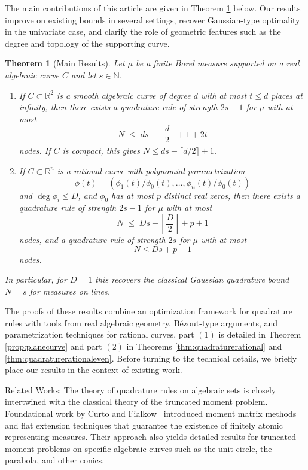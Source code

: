 \documentclass[11pt,a4paper]{amsart}
\makeatletter
\numberwithin{equation}{section}
\newtheorem{thm}{Theorem}
\theoremstyle{definition}
\newcommand{\R}{\mathbb{R}}
\numberwithin{thm}{section}
\def\paragraph{\@startsection{paragraph}{4}%
  \z@{.5\linespacing\@plus.7\linespacing}{-.5em}%
  {\normalfont\normalsize\bfseries}}
\theoremstyle{break}
\numberwithin{subcase}{case}
\makeatother
\begin{document}
The main contributions of this article are given in Theorem \ref{thm1} below. Our results improve on existing bounds in several settings, recover Gaussian-type optimality in the univariate case, and clarify the role of geometric features such as the degree and topology of the supporting curve.\newpage 

\begin{thm}[Main Results]\label{thm1}
Let $\mu$ be a finite Borel measure supported on a real algebraic curve $C$ and let $s \in \mathbb{N}$.
\begin{enumerate}
    \item 
    If $C \subset \R^2$ is a smooth algebraic curve of degree $d$ with at most $t \le d$ places at infinity, then there exists a quadrature rule of strength $2s-1$ for $\mu$ with at most
    \[
    N \;\le\; d s - \left\lceil \frac{d}{2} \right\rceil + 1 + 2t
    \]
    nodes. If $C$ is compact, this gives $N \le d s - \lceil d/2 \rceil + 1$.
    
    \item 
    If $C \subset \R^n$ is a rational curve with polynomial parametrization \[\phi(t) = (\phi_1(t)/\phi_0(t), \ldots, \phi_n(t)/\phi_0(t))\] and $\deg \phi_i \le D$, and $\phi_0$ has at most $p$ distinct real zeros, then there exists a quadrature rule of strength $2s-1$ for $\mu$ with at most
    \[
    N \;\le\; D s - \left\lceil \frac{D}{2} \right\rceil + p + 1
    \]
    nodes, and a quadrature rule of strength $2s$ for $\mu$ with at most $$
    N\leq Ds+p+1
    $$
    nodes.
\end{enumerate}
In particular, for $D=1$ this recovers the classical Gaussian quadrature bound $N=s$ for measures on lines.
\end{thm}



The proofs of these results combine an optimization framework for quadrature rules with tools from real algebraic geometry, Bézout-type arguments, and parametrization techniques for rational curves, part $(1)$ is detailed in Theorem \ref{prop:planecurve} and part $(2)$ in Theorems \ref{thm:quadraturerational} and \ref{thm:quadraturerationaleven}. Before turning to the technical details, we briefly place our results in the context of existing work.

\paragraph{Related Works:}  
The theory of quadrature rules on algebraic sets is closely intertwined with the classical theory of the truncated moment problem. Foundational work by Curto and Fialkow~\cite{CurtoFialkow1991,CurtoFialkow1996,CurtoFialkow2008} introduced moment matrix methods and flat extension techniques that guarantee the existence of finitely atomic representing measures. Their approach also yields detailed results for truncated moment problems on specific algebraic curves such as the unit circle, the parabola, and other conics. 
\end{document}
